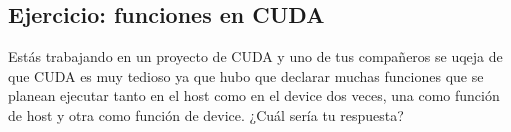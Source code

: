 \subsection{Ejercicio: funciones en CUDA}

Estás trabajando en un proyecto de CUDA y uno de tus compañeros se uqeja de que CUDA es muy tedioso ya que hubo que
declarar muchas funciones que se planean ejecutar tanto en el host como en el device dos veces, una como función de host
y otra como función de device. ¿Cuál sería tu respuesta?




